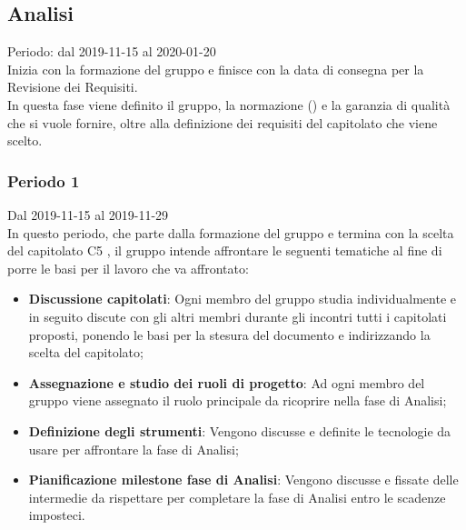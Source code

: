 \subsection{Analisi}
Periodo: dal 2019-11-15 al 2020-01-20\\
Inizia con la formazione del gruppo e finisce con la data di consegna per la Revisione dei Requisiti.\\
In questa fase viene definito il gruppo, la normazione () e la garanzia di qualità che si vuole fornire, oltre alla definizione dei requisiti del capitolato che viene scelto.

\subsubsection{Periodo 1}
Dal 2019-11-15 al 2019-11-29\\
In questo periodo, che parte dalla formazione del gruppo e termina con la scelta del capitolato C5 \NomeProgetto{}, il gruppo intende affrontare le seguenti tematiche al fine di porre le basi per il lavoro che va affrontato:
\begin{itemize}
	\item \textbf{Discussione capitolati}: Ogni membro del gruppo studia individualmente e in seguito discute con gli altri membri durante gli incontri tutti i capitolati proposti, ponendo le basi per la stesura del documento \SdF{} e indirizzando la scelta del capitolato;
	\item \textbf{Assegnazione e studio dei ruoli di progetto}: Ad ogni membro del gruppo viene assegnato il ruolo principale da ricoprire nella fase di Analisi;
	\item \textbf{Definizione degli strumenti}: Vengono discusse e definite le tecnologie da usare per affrontare la fase di Analisi;
	\item \textbf{Pianificazione milestone fase di Analisi}: Vengono discusse e fissate delle  intermedie da rispettare per completare la fase di Analisi entro le scadenze imposteci.
\end{itemize}

